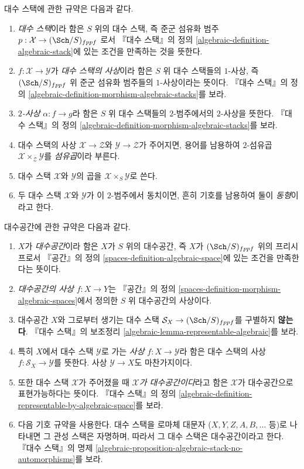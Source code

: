 \medskip\noindent
대수 스택에 관한 규약은 다음과 같다.
\begin{enumerate}
\item {\it 대수 스택}이라 함은 $S$ 위의 대수 스택, 즉 준군 섬유화 범주
$p : \mathcal{X} \to (\Sch/S)_{fppf}$
로서 『대수 스택』의 정의
\ref{algebraic-definition-algebraic-stack}에 있는 조건을
만족하는 것을 뜻한다.
\item $f : \mathcal{X} \to \mathcal{Y}$가
{\it 대수 스택의 사상}이라 함은 $S$ 위 대수 스택들의 $1$-사상,
즉 $(\Sch/S)_{fppf}$ 위 준군 섬유화 범주들의 $1$-사상이라는 뜻이다.
『대수 스택』의 정의
\ref{algebraic-definition-morphism-algebraic-stacks}를 보라.
\item {\it $2$-사상} $\alpha : f \to g$라 함은 $S$ 위 대수 스택들의
$2$-범주에서의 $2$-사상을 뜻한다. 『대수 스택』의 정의
\ref{algebraic-definition-morphism-algebraic-stacks}를 보라.
\item 대수 스택의 사상 $\mathcal{X} \to \mathcal{Z}$와
$\mathcal{Y} \to \mathcal{Z}$가 주어지면, 용어를 남용하여 $2$-섬유곱
$\mathcal{X} \times_\mathcal{Z} \mathcal{Y}$를 {\it 섬유곱}이라 부른다.
\item 대수 스택 $\mathcal{X}$와 $\mathcal{Y}$의 곱을
$\mathcal{X} \times_S \mathcal{Y}$로 쓴다.
\item 두 대수 스택 $\mathcal{X}$와 $\mathcal{Y}$가 이 $2$-범주에서
동치이면, 흔히 기호를 남용하여 둘이 {\it 동형}이라고 한다.
\end{enumerate}
대수공간에 관한 규약은 다음과 같다.
\begin{enumerate}
\item $X$가 {\it 대수공간}이라 함은 $X$가 $S$ 위의 대수공간,
즉 $X$가 $(\Sch/S)_{fppf}$ 위의 프리시프로서 『공간』의 정의
\ref{spaces-definition-algebraic-space}에 있는 조건을
만족한다는 뜻이다.
\item {\it 대수공간의 사상} $f :X \to Y$는 『공간』의 정의
\ref{spaces-definition-morphism-algebraic-spaces}에서 정의한
$S$ 위 대수공간의 사상이다.
\item 대수공간 $X$와 그로부터 생기는 대수 스택
$\mathcal{S}_X \to (\Sch/S)_{fppf}$를 구별하지 {\bf 않는다}.
『대수 스택』의 보조정리
\ref{algebraic-lemma-representable-algebraic}를 보라.
\item 특히 $X$에서 대수 스택 $\mathcal{Y}$로 가는 {\it 사상}
$f : X \to \mathcal{Y}$라 함은 대수 스택의 사상
$f : \mathcal{S}_X \to \mathcal{Y}$를 뜻한다.
사상 $\mathcal{Y} \to X$도 마찬가지이다.
\item 또한 대수 스택 $\mathcal{X}$가 주어졌을 때
{\it $\mathcal{X}$가 대수공간이다}라고 함은 $\mathcal{X}$가
대수공간으로 표현가능하다는 뜻이다. 『대수 스택』의 정의
\ref{algebraic-definition-representable-by-algebraic-space}를 보라.
\item 다음 기호 규약을 사용한다. 대수 스택을 로마체 대문자
($X, Y, Z, A, B, \ldots$ 등)로 나타내면 그 관성 스택은 자명하며,
따라서 그 대수 스택은 대수공간이라고 한다. 『대수 스택』의 명제
\ref{algebraic-proposition-algebraic-stack-no-automorphisms}를 보라.
\end{enumerate}
